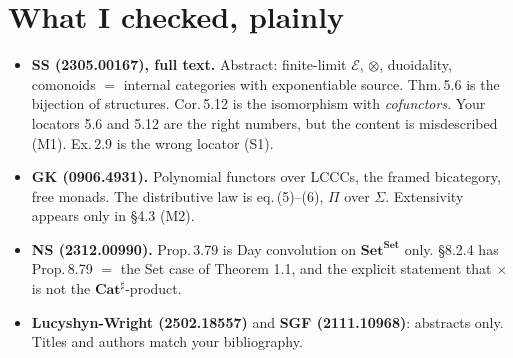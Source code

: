 \documentclass[11pt]{article}
\newcommand{\Cat}{\mathbf{Cat}}
\newcommand{\Set}{\mathbf{Set}}
\newcommand{\E}{\mathcal{E}}
\begin{document}
\section*{What I checked, plainly}
\begin{itemize}[leftmargin=*]
\item \textbf{SS (2305.00167), full text.} Abstract: finite-limit $\E$, $\otimes$, duoidality,
  comonoids $=$ internal categories with exponentiable source. Thm.\,5.6 is the bijection of
  structures. Cor.\,5.12 is the isomorphism with \emph{cofunctors}. Your locators 5.6 and 5.12 are
  the right numbers, but the content is misdescribed (M1). Ex.\,2.9 is the wrong locator (S1).
\item \textbf{GK (0906.4931).} Polynomial functors over LCCCs, the framed bicategory, free
  monads. The distributive law is eq.\,(5)--(6), $\Pi$ over $\Sigma$. Extensivity appears only in
  \S4.3 (M2).
\item \textbf{NS (2312.00990).} Prop.\,3.79 is Day convolution on $\Set^\Set$ only. \S8.2.4 has
  Prop.\,8.79 $=$ the Set case of Theorem 1.1, and the explicit statement that $\times$ is not the
  $\Cat^\sharp$-product.
\item \textbf{Lucyshyn-Wright (2502.18557)} and \textbf{SGF (2111.10968)}: abstracts only. Titles and
  authors match your bibliography.
\end{itemize}
\end{document}
